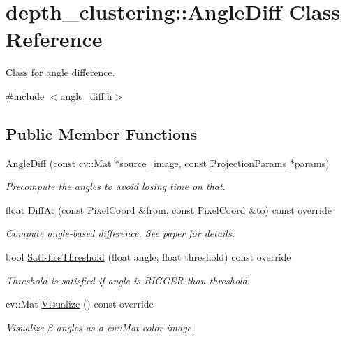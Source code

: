 \hypertarget{classdepth__clustering_1_1AngleDiff}{}\section{depth\+\_\+clustering\+:\+:Angle\+Diff Class Reference}
\label{classdepth__clustering_1_1AngleDiff}


Class for angle difference.  




{\ttfamily \#include $<$angle\+\_\+diff.\+h$>$}

\subsection*{Public Member Functions}
\begin{DoxyCompactItemize}
\item 
\hyperlink{classdepth__clustering_1_1AngleDiff_a40371150bff3a10dd8ce40788b9bd160}{Angle\+Diff} (const cv\+::\+Mat $\ast$source\+\_\+image, const \hyperlink{classdepth__clustering_1_1ProjectionParams}{Projection\+Params} $\ast$params)
\begin{DoxyCompactList}\small\item\em Precompute the angles to avoid losing time on that. \end{DoxyCompactList}\item 
float \hyperlink{classdepth__clustering_1_1AngleDiff_ac9bd0ec61ff0b213fd19235dc171c1c2}{Diff\+At} (const \hyperlink{structdepth__clustering_1_1PixelCoord}{Pixel\+Coord} \&from, const \hyperlink{structdepth__clustering_1_1PixelCoord}{Pixel\+Coord} \&to) const override
\begin{DoxyCompactList}\small\item\em Compute angle-\/based difference. See paper for details. \end{DoxyCompactList}\item 
\mbox{\label{classdepth__clustering_1_1AngleDiff_ac65e8f42b1f2ac82db14ebe188c004a2}} 
bool \hyperlink{classdepth__clustering_1_1AngleDiff_ac65e8f42b1f2ac82db14ebe188c004a2}{Satisfies\+Threshold} (float angle, float threshold) const override
\begin{DoxyCompactList}\small\item\em Threshold is satisfied if angle is B\+I\+G\+G\+ER than threshold. \end{DoxyCompactList}\item 
cv\+::\+Mat \hyperlink{classdepth__clustering_1_1AngleDiff_a462e4aadd35ca06e9b061d08c9787074}{Visualize} () const override
\begin{DoxyCompactList}\small\item\em Visualize $\beta$ angles as a {\ttfamily cv\+::\+Mat} color image. \end{DoxyCompactList}\end{DoxyCompactItemize}
